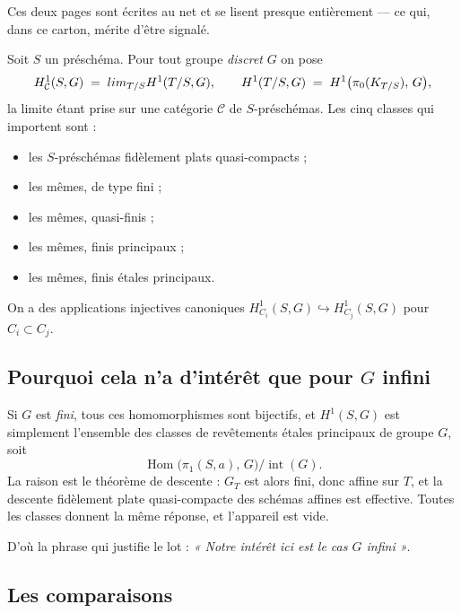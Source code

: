 \documentclass[11pt,a4paper]{article}
\begin{document}
Ces deux pages sont écrites au net et se lisent presque entièrement --- ce qui,
dans ce carton, mérite d'être signalé.

Soit $S$ un préschéma. Pour tout groupe \emph{discret} $G$ on pose
\[
  H^{1}_{\mathcal{C}}(S, G) \;=\; \varinjlim_{T/S} H^{1}(T/S, G) ,
  \qquad
  H^{1}(T/S, G) \;=\; H^{1}\bigl(\pi_{0}(K_{T/S}),\, G\bigr) ,
\]
la limite étant prise sur une catégorie $\mathcal{C}$ de $S$-préschémas. Les
cinq classes qui importent sont :

\begin{itemize}
  \item[$C_{1}$] les $S$-préschémas fidèlement plats quasi-compacts ;
  \item[$C_{2}$] les mêmes, de type fini ;
  \item[$C_{3}$] les mêmes, quasi-finis ;
  \item[$C_{4}$] les mêmes, finis principaux ;
  \item[$C_{5}$] les mêmes, finis étales principaux.
\end{itemize}

On a des applications injectives canoniques $H^{1}_{C_{i}}(S,G)
\hookrightarrow H^{1}_{C_{j}}(S,G)$ pour $C_{i} \subset C_{j}$.

\subsection*{Pourquoi cela n'a d'intérêt que pour $G$ infini}

Si $G$ est \emph{fini}, tous ces homomorphismes sont bijectifs, et
$H^{1}(S,G)$ est simplement l'ensemble des classes de revêtements étales
principaux de groupe $G$, soit
\[
  \operatorname{Hom}\bigl(\pi_{1}(S,a),\, G\bigr) \big/
  \operatorname{int}(G) .
\]
La raison est le théorème de descente : $G_{T}$ est alors fini, donc affine sur
$T$, et la descente fidèlement plate quasi-compacte des schémas affines est
effective. Toutes les classes donnent la même réponse, et l'appareil est vide.

D'où la phrase qui justifie le lot : \emph{« Notre intérêt ici est le cas $G$
infini »}.

\subsection*{Les comparaisons}
\end{document}
